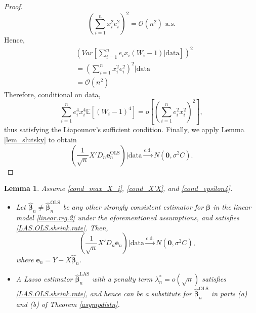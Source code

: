 \documentclass[12pt]{article}
\newcommand{\EX}{\mathbb{E}} %
\newcommand{\bhat}{\widehat{\bm{\beta}}_n} %
\newcommand{\bLAS}{\widehat{\bm{\beta}}_n^{\text{LAS}}} %
\newcommand{\bLS}{\widehat{\bm{\beta}}_n^{\text{OLS}}} %
\newcommand{\be}{\bm{\beta}} %
\newcommand{\eLS}{\bm{e}_n^{\text{OLS}}} %
\newcommand{\sumin}{\sum_{i=1}^n} %
\newcommand{\dqn}{\frac{1}{\sqrt{n}}} %
\newcommand{\CONV}[1]{\stackrel{\text{#1}}{\longrightarrow}} %
\newtheorem{lem}{Lemma}[section]
\begin{document}
\begin{proof}
	$$
	\left( \sumin x_i^2 e_i^2 \right)^2 
	= \mathcal{O} (n^2)
	\,\, \text{a.s.}
	$$
	Hence, 
	\begin{align*}
	&\left( Var 
		\left[
			\sumin e_i x_i (W_i - 1)
			\bigg| \text{data}
		\right] 
	\right)^2 \\
	&= \left( 
			\sumin x_i^2 e_i^2 
		\right)^2 
		\bigg| \text{data} \\
	&= \mathcal{O} (n^2)
	\end{align*}
	Therefore, conditional on data, 
	$$
	\sumin e_i^4 x_i^4 \EX \left[ (W_i - 1)^4 \right]
	= o \left[ \left(
				\sumin e_i^2 x_i^2 
				\right)^2 
		\right],
	$$ 
	thus satisfying the Liapounov's sufficient condition. Finally, we apply Lemma \ref{lem_slutsky} to obtain
	$$
	\left( 
		\dqn X' D_n \eLS 
	\right) \bigg| \text{data}
	\CONV{c.d.} 
	N \left( \bm{0}, \sigma^2 C \right).
	$$
\end{proof}

\begin{lem} \label{lem_X'Dne_normal2}
	Assume \eqref{cond_max_X_i}, \eqref{cond_X'X}, and \eqref{cond_epsilon4}. 
	\begin{itemize}
		\item [ (a) ] Let $\bhat \neq \bLS$ be any other strongly consistent estimator for $\be$ in the linear model \eqref{linear.reg.2} under the aforementioned assumptions, and satisfies \eqref{LAS.OLS.shrink.rate}. Then, 
			$$
			\left( 
				\dqn X' D_n \bm{e}_n 
			\right) \bigg| \text{data}
			\CONV{c.d.} 
			N \left( \bm{0}, \sigma^2 C \right),
			$$
		where $\bm{e}_n = Y - X \bhat$. \\
		\item [ (b) ] A Lasso estimator $\bLAS$ with a penalty term $\lambda_n^* = o( \sqrt{n} )$ satisfies \eqref{LAS.OLS.shrink.rate}, and hence can be a substitute for $\bLS$ in parts (a) and (b) of Theorem \ref{asympdistn}. 
	\end{itemize}	
\end{lem}
\end{document}
